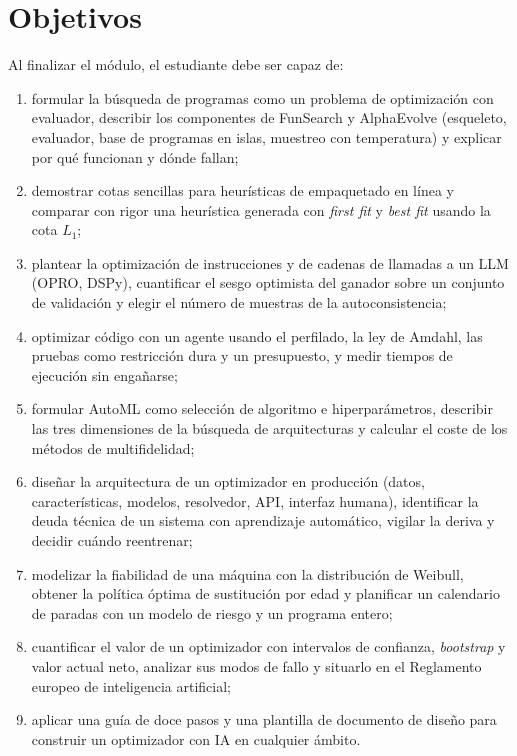 \documentclass[11pt,a4paper,twoside,openany]{book}
\begin{document}
\section*{Objetivos}
Al finalizar el módulo, el estudiante debe ser capaz de:
\begin{enumerate}[label=\arabic*.]
  \item formular la búsqueda de programas como un problema de optimización con evaluador, describir los componentes de FunSearch y AlphaEvolve (esqueleto, evaluador, base de programas en islas, muestreo con temperatura) y explicar por qué funcionan y dónde fallan;
  \item demostrar cotas sencillas para heurísticas de empaquetado en línea y comparar con rigor una heurística generada con \emph{first fit} y \emph{best fit} usando la cota $L_1$;
  \item plantear la optimización de instrucciones y de cadenas de llamadas a un LLM (OPRO, DSPy), cuantificar el sesgo optimista del ganador sobre un conjunto de validación y elegir el número de muestras de la autoconsistencia;
  \item optimizar código con un agente usando el perfilado, la ley de Amdahl, las pruebas como restricción dura y un presupuesto, y medir tiempos de ejecución sin engañarse;
  \item formular AutoML como selección de algoritmo e hiperparámetros, describir las tres dimensiones de la búsqueda de arquitecturas y calcular el coste de los métodos de multifidelidad;
  \item diseñar la arquitectura de un optimizador en producción (datos, características, modelos, resolvedor, API, interfaz humana), identificar la deuda técnica de un sistema con aprendizaje automático, vigilar la deriva y decidir cuándo reentrenar;
  \item modelizar la fiabilidad de una máquina con la distribución de Weibull, obtener la política óptima de sustitución por edad y planificar un calendario de paradas con un modelo de riesgo y un programa entero;
  \item cuantificar el valor de un optimizador con intervalos de confianza, \emph{bootstrap} y valor actual neto, analizar sus modos de fallo y situarlo en el Reglamento europeo de inteligencia artificial;
  \item aplicar una guía de doce pasos y una plantilla de documento de diseño para construir un optimizador con IA en cualquier ámbito.
\end{enumerate}
\end{document}
